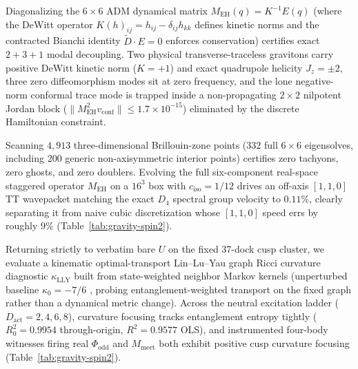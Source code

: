 Diagonalizing the $6 \times 6$ ADM dynamical matrix $M_{\mathrm{EH}}(q) = K^{-1} E(q)$ (where the DeWitt operator
$K(h)_{ij} = h_{ij} - \delta_{ij} h_{kk}$ defines kinetic norms and the contracted Bianchi identity $\tilde{D} \cdot E = 0$
enforces conservation) certifies exact $2 + 3 + 1$ modal decoupling. Two physical transverse-traceless gravitons carry
positive DeWitt kinetic norm ($K = +1$) and exact quadrupole helicity $J_z = \pm 2$, three zero diffeomorphism modes sit
at zero frequency, and the lone negative-norm conformal trace mode is trapped inside a non-propagating $2 \times 2$
nilpotent Jordan block ($\|M_{\mathrm{EH}}^2 v_{\mathrm{conf}}\| \le 1.7 \times 10^{-15}$) eliminated by the discrete
Hamiltonian constraint.

Scanning $4{,}913$ three-dimensional Brillouin-zone points ($332$ full $6 \times 6$ eigensolves, including $200$ generic
non-axisymmetric interior points) certifies zero tachyons, zero ghosts, and zero doublers. Evolving the full
six-component real-space staggered operator $M_{\mathrm{EH}}$ on a $16^3$ box with $c_{\mathrm{iso}} = 1/12$ drives an
off-axis $[1,1,0]$ TT wavepacket matching the exact $D_4$ spectral group velocity to $0.11\%$, clearly separating it
from naive cubic discretization whose $[1,1,0]$ speed errs by roughly $9\%$ (Table~\ref{tab:gravity-spin2}).

Returning strictly to verbatim bare $U$ on the fixed 37-dock cusp cluster, we evaluate a kinematic optimal-transport
Lin--Lu--Yau graph Ricci curvature diagnostic $\kappa_{\mathrm{LLY}}$ built from state-weighted neighbor Markov kernels
(unperturbed baseline $\kappa_0 = -7/6$ \cite{lin2011lly, jacobson1995}, probing entanglement-weighted transport on
the fixed graph rather than a dynamical metric change). Across the neutral excitation ladder ($D_{\mathrm{act}} = 2, 4,
6, 8$), curvature focusing tracks entanglement entropy tightly ($R_0^2 = 0.9954$ through-origin, $R^2 = 0.9577$ OLS),
and instrumented four-body witnesses firing real $\Phi_{\mathrm{odd}}$ and $M_{\mathrm{meet}}$ both exhibit positive
cusp curvature focusing (Table~\ref{tab:gravity-spin2}).

